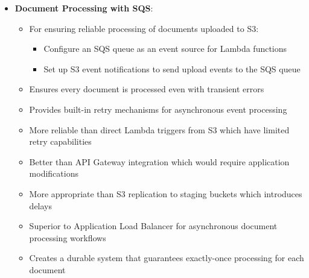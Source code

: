 \documentclass[11pt,a4paper]{report}
\begin{document}
\begin{itemize}
\begin{itemize}
  \item Enables efficient workflow management between application tiers
\end{itemize}
  \item \textbf{Document Processing with SQS}:
\begin{itemize}
  \item For ensuring reliable processing of documents uploaded to S3:
\begin{itemize}
  \item Configure an SQS queue as an event source for Lambda functions
  \item Set up S3 event notifications to send upload events to the SQS queue
\end{itemize}
  \item Ensures every document is processed even with transient errors
  \item Provides built-in retry mechanisms for asynchronous event processing
  \item More reliable than direct Lambda triggers from S3 which have limited retry capabilities
  \item Better than API Gateway integration which would require application modifications
  \item More appropriate than S3 replication to staging buckets which introduces delays
  \item Superior to Application Load Balancer for asynchronous document processing workflows
  \item Creates a durable system that guarantees exactly-once processing for each document
\end{itemize}
\end{itemize}
\end{document}
